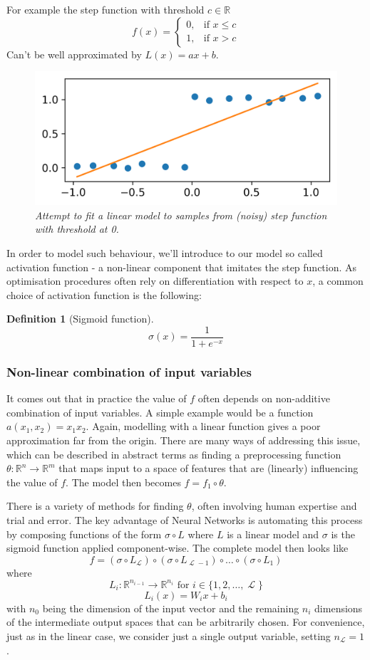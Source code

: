 \documentclass[a4paper]{article}
\theoremstyle{break}
\newtheorem{definition}{Definition}[section]
\newcommand{\R}{\mathbb{R}}
\DeclareMathOperator{\La}{\mathcal{L}}
\begin{document}
For example the step function with threshold $c \in \R$
$$ f(x) =
\begin{cases}
    0,& \text{if } x\leq c\\
    1,& \text{if } x > c
\end{cases}$$
Can't be well approximated by $L(x) = a x  + b$.

\begin{figure}[bph]
    \centering
    \includegraphics[width=0.4\linewidth]{step_linfit.png}
    \caption{\textit{Attempt to fit a linear model to samples from (noisy) step function with threshold at 0.}}
\end{figure}

In order to model such behaviour, we'll introduce to our model so called activation function - a non-linear component  that imitates the step function. As optimisation procedures often rely on differentiation with respect to $x$, a common choice of activation function is the following:

\begin{definition}[Sigmoid function]
    $$ \sigma(x) = \frac{1}{1 + e^{-x}}$$
\end{definition}

 
\subsubsection{Non-linear combination of input variables}
It comes out that in practice the value of $f$ often depends on non-additive combination of input variables. A simple example would be a function $a(x_1, x_2) = x_1 x_2$. Again, modelling with a linear function gives a poor approximation far from the origin.
There are many ways of addressing this issue, which can be described in abstract terms as finding a preprocessing function $ \theta : \R^n \to \R^m$ that maps input to a space of features that are (linearly) influencing the value of $f$. The model then becomes $ f = f_1 \circ \theta $.

There is a variety of methods for finding $\theta$, often involving human expertise and trial and error. The key advantage of Neural Networks is automating this process by composing functions of the form $ \sigma \circ L$ where $L$ is a linear model and $\sigma$ is the sigmoid function applied component-wise.
The complete model then looks like
$$ f = (\sigma \circ L_{\La}) \circ (\sigma \circ L_{\La - 1}) \circ \ldots \circ (\sigma \circ L_{1}) $$
where
$$ L_i : \R^{n_{i-1}} \to \R^{n_{i}} \text{ for } i \in \{1, 2, \ldots, \La \} $$
$$ L_i(x) = W_i x + b_i $$
with $ n_0 $ being the dimension of the input vector and the remaining $ n_i $ dimensions of the intermediate output spaces that can be arbitrarily chosen. For convenience, just as in the linear case, we consider just a single output variable, setting $ n_{\La} = 1 $. 
\end{document}
